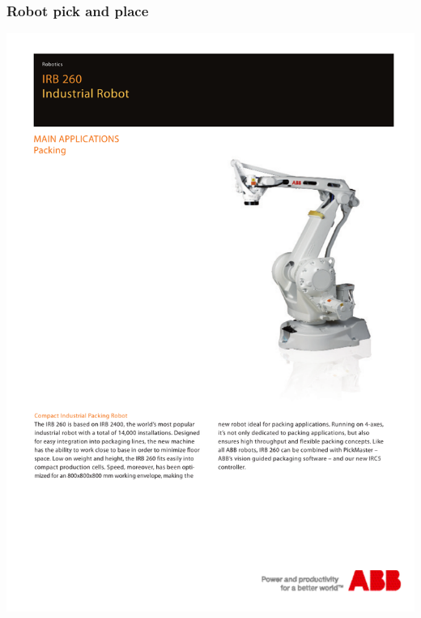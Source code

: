\subsubsection{Robot pick and place}
\hspace*{-2cm}
\includegraphics[page=2]{Datasheets/IRB-260.pdf}
\newpage
